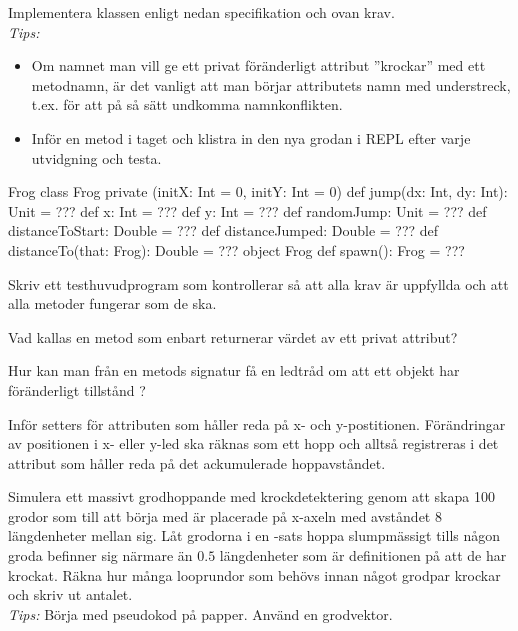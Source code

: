 \Subtask Implementera klassen  enligt nedan specifikation och ovan krav. \\  \emph{Tips:}
  \begin{itemize} [nolistsep, noitemsep]
  \item Om namnet man vill ge ett privat föränderligt attribut ''krockar'' med ett metodnamn, är det vanligt att man börjar attributets namn med understreck, t.ex.  för att på så sätt undkomma namnkonflikten.
  \item Inför en metod i taget och klistra in den nya grodan i REPL efter varje utvidgning och testa.
  \end{itemize}

\begin{ScalaSpec}{Frog}
class Frog private (initX: Int = 0, initY: Int = 0) {
  def jump(dx: Int, dy: Int): Unit = ???
  def x: Int = ???
  def y: Int = ???
  def randomJump: Unit = ???
  def distanceToStart: Double = ???
  def distanceJumped: Double = ???
  def distanceTo(that: Frog): Double = ???
}
object Frog {
  def spawn(): Frog = ???
}
\end{ScalaSpec}

\Subtask Skriv ett testhuvudprogram som kontrollerar så att alla krav är uppfyllda och att alla metoder fungerar som de ska.

\Subtask\Pen Vad kallas en metod som enbart returnerar värdet av ett privat attribut?

\Subtask\Pen Hur kan man från en metods signatur få en ledtråd om att ett objekt har föränderligt tillstånd ?

\Subtask Inför setters för attributen som håller reda på x- och y-postitionen. Förändringar av positionen i x- eller y-led ska räknas som ett hopp och alltså registreras i det attribut som håller reda på det ackumulerade hoppavståndet.

\Subtask Simulera ett massivt grodhoppande med krockdetektering genom att skapa 100 grodor som till att börja med är placerade på x-axeln med avståndet $8$ längdenheter mellan sig. Låt grodorna i en -sats hoppa slumpmässigt tills någon groda befinner sig närmare än $0.5$ längdenheter som är definitionen på att de har krockat. Räkna hur många looprundor som behövs innan något grodpar krockar och skriv ut antalet. \\ \emph{Tips:} Börja med pseudokod på papper. Använd en grodvektor.

\clearpage

\ExtraTasks %

